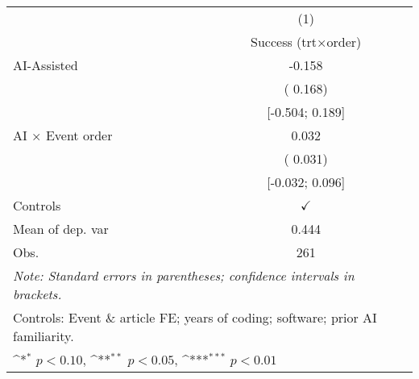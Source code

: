 \def\sym#1{\ifmmode^{#1}\else\(^{#1}\)\fi}
\begin{tabular}{l*{1}{c}}
\hline\hline
 & (1)
\\
 & Success (trt×order)
 \\
\hline
AI-Assisted & -0.158
\\
 & ( 0.168)
\\
 & [-0.504;  0.189]
\\
AI × Event order &  0.032
\\
 & ( 0.031)
\\
 & [-0.032;  0.096]
\\
\hline
Controls & $\checkmark$
\\
Mean of dep. var &  0.444
\\
Obs. & 261
\\
\hline
\hline\hline
\multicolumn{2}{l}{\it{Note:} Standard errors in parentheses; confidence intervals in brackets.}\\
\multicolumn{2}{l}{Controls: Event \& article FE; years of coding; software; prior AI familiarity.}\\
\multicolumn{2}{l}{\sym{*} $p<0.10$, \sym{**} $p<0.05$,  \sym{***} $p<0.01$}\\
\end{tabular}
